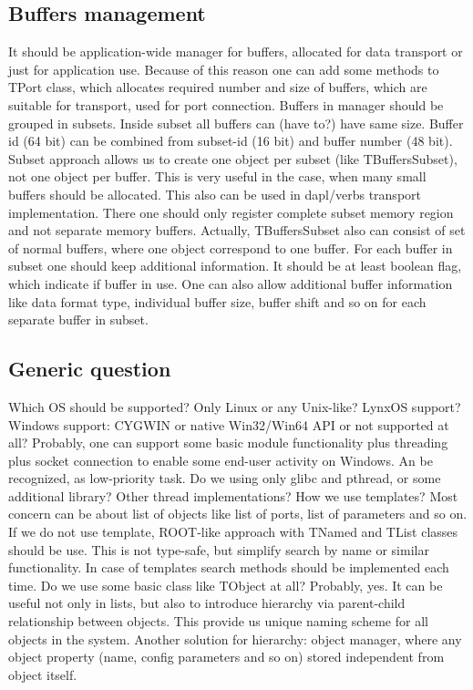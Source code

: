 \subsection{Buffers management}
It should be application-wide manager for buffers, allocated for data transport or just for application use. 
Because of this reason one can add some methods to TPort class, which allocates required number and size of buffers, which are suitable for transport, used for port connection. 
Buffers in manager should be grouped in subsets. Inside subset all buffers can (have to?) have same size. Buffer id (64 bit) can be combined from subset-id (16 bit) and buffer number (48 bit). 
Subset approach allows us to create one object per subset (like TBuffersSubset), not one object per buffer. This is very useful in the case, when many small buffers should be allocated. This also can be used in dapl/verbs transport implementation. There one should only register complete subset memory region and not separate memory buffers.
Actually, TBuffersSubset also can consist of set of normal buffers, where one object correspond to one buffer. 
For each buffer in subset one should keep additional information. It should be at least boolean flag, which indicate if buffer in use. One can also allow additional buffer information like data format type, individual buffer size, buffer shift and so on for each separate buffer in subset.

\subsection{Generic question} 
Which OS should be supported? Only Linux or any Unix-like? LynxOS support? 
Windows support: CYGWIN or native Win32/Win64 API or not supported at all? Probably, one can support some basic module functionality plus threading plus socket connection to enable some end-user activity on Windows. An be recognized, as low-priority task.
Do we using only glibc and pthread, or some additional library? Other thread implementations?
How we use templates? Most concern can be about list of objects like list of ports, list of parameters and so on. If we do not use template, ROOT-like approach with TNamed and TList classes should be use. This is not type-safe, but simplify search by name or similar functionality. In case of templates search methods should be implemented each time.
Do we use some basic class like TObject at all? Probably, yes. It can be useful not only in lists, but also to introduce hierarchy via parent-child relationship between objects. This provide us unique naming scheme for all objects in the system. Another solution for hierarchy: object manager, where any object property (name, config parameters and so on) stored independent from object itself.

